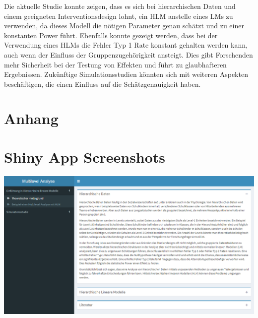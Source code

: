 \documentclass[12pt, a4paper]{article}\usepackage[]{graphicx}\usepackage[]{color}
\begin{document}
Die aktuelle Studie konnte zeigen, dass es sich bei hierarchischen Daten und einem geeigneten Interventionsdesign lohnt, ein HLM anstelle eines LMs zu verwenden, da dieses Modell die nötigen Parameter genau schätzt und zu einer konstanten Power führt. Ebenfalls konnte gezeigt werden, dass bei der Verwendung eines HLMs die Fehler Typ 1 Rate konstant gehalten werden kann, auch wenn der Einfluss der Gruppenzugehörigkeit ansteigt. Dies gibt Forschenden mehr Sicherheit bei der Testung von Effekten und führt zu glaubhafteren Ergebnissen. Zukünftige Simulationsstudien könnten sich mit weiteren Aspekten beschäftigen, die einen Einfluss auf die Schätzgenauigkeit haben.





\newpage
\singlespacing




\section{Anhang}
\appendix
\section*{Shiny App Screenshots}
\begin{center}
\includegraphics[scale=0.5]{./figures/app_theory}
\end{center}
\end{document}
